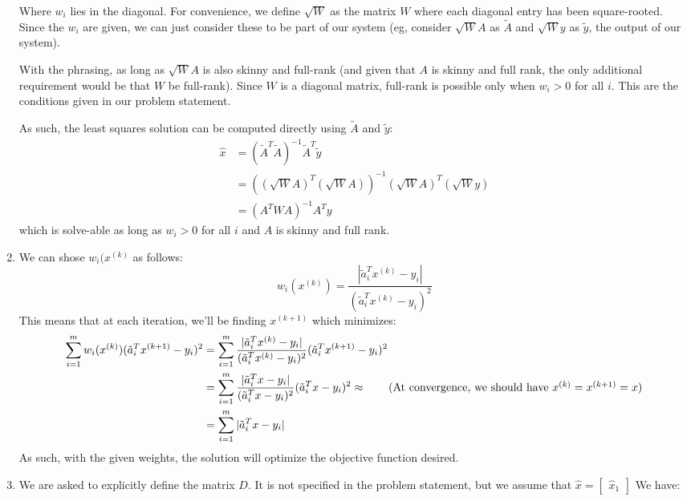 \documentclass[12pt]{exam}
\begin{document}
\begin{questions}
\begin{solution}
\begin{enumerate}[label=(\alph*)]
    Where $w_i$ lies in the diagonal. For convenience, we define $\sqrt{W}$ as the matrix $W$ where each diagonal entry has been square-rooted. Since the $w_i$ are given, we can just consider these to be part of our system (eg, consider $\sqrt{W}A$ as $\tilde{A}$ and $\sqrt{W}y$ as $\tilde{y}$, the output of our system).

    With the phrasing, as long as $\sqrt{W}A$ is also skinny and full-rank (and given that $A$ is skinny and full rank, the only additional requirement would be that $W$ be full-rank). Since $W$ is a diagonal matrix, full-rank is possible only when $w_i > 0$ for all $i$. This are the conditions given in our problem statement.

    As such, the least squares solution can be computed directly using $\tilde{A}$ and $\tilde{y}$:
    \begin{align*}
      \hat{x} &= (\tilde{A}^T\tilde{A})^{-1}\tilde{A}^T\tilde{y} \\
      &= ((\sqrt{W}A)^T(\sqrt{W}A))^{-1}(\sqrt{W}A)^T(\sqrt{W}y) \\
      &= (A^TWA)^{-1}A^Ty
    \end{align*}
    which is solve-able as long as $w_i > 0$ for all $i$ and $A$ is skinny and full rank.
    \item We can shose $w_i(x^{(k)}$ as follows:
      \[  
        w_i(x^{(k)}) = \frac{|\tilde{a}_i^T x^{(k)} - y_i|}{(\tilde{a}_i^T x^{(k)} - y_i)^2}
      \]
      This means that at each iteration, we'll be finding $x^({k + 1})$ which minimizes:
      \begin{align*}
        \sum_{i=1}^m  w_i(x^{(k)})(\tilde{a}_i^T x^{(k+1)} - y_i)^2 &= \sum_{i=1}^m  \frac{|\tilde{a}_i^T x^{(k)} - y_i|}{(\tilde{a}_i^T x^{(k)} - y_i)^2}(\tilde{a}_i^T x^{(k+1)} - y_i)^2 \\
        &=\sum_{i=1}^m  \frac{|\tilde{a}_i^T x - y_i|}{(\tilde{a}_i^T x - y_i)^2}(\tilde{a}_i^T x - y_i)^2 \approx \tag{At convergence, we should have $x^{(k)} = x^{(k+1)} = x$} \\
        &= \sum_{i=1}^m |\tilde{a}_i^T x - y_i|  
      \end{align*}
      As such, with the given weights, the solution will optimize the objective function desired.
    \item We are asked to explicitly define the matrix $D$. It is not specified in the problem statement, but we assume that $\hat{x} = \begin{bmatrix} \hat{x}_1 \end{bmatrix}$ We have:
    \[
\]
\end{enumerate}
\end{solution}
\end{questions}
\end{document}
